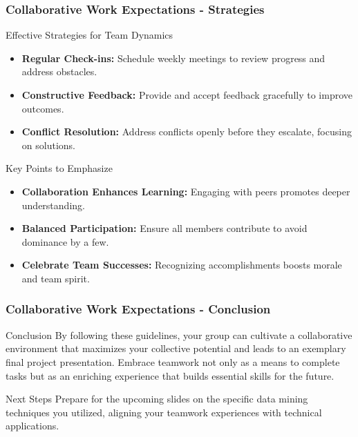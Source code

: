 \documentclass[aspectratio=169]{beamer}
\begin{document}
\begin{frame}[fragile]
    \frametitle{Collaborative Work Expectations - Strategies}
    \begin{block}{Effective Strategies for Team Dynamics}
        \begin{itemize}
            \item \textbf{Regular Check-ins:} Schedule weekly meetings to review progress and address obstacles.
            \item \textbf{Constructive Feedback:} Provide and accept feedback gracefully to improve outcomes.
            \item \textbf{Conflict Resolution:} Address conflicts openly before they escalate, focusing on solutions.
        \end{itemize}
    \end{block}

    \begin{block}{Key Points to Emphasize}
        \begin{itemize}
            \item \textbf{Collaboration Enhances Learning:} Engaging with peers promotes deeper understanding.
            \item \textbf{Balanced Participation:} Ensure all members contribute to avoid dominance by a few.
            \item \textbf{Celebrate Team Successes:} Recognizing accomplishments boosts morale and team spirit.
        \end{itemize}
    \end{block}
\end{frame}

\begin{frame}[fragile]
    \frametitle{Collaborative Work Expectations - Conclusion}
    \begin{block}{Conclusion}
        By following these guidelines, your group can cultivate a collaborative environment that maximizes your collective potential and leads to an exemplary final project presentation. Embrace teamwork not only as a means to complete tasks but as an enriching experience that builds essential skills for the future.
    \end{block}

    \begin{block}{Next Steps}
        Prepare for the upcoming slides on the specific data mining techniques you utilized, aligning your teamwork experiences with technical applications.
    \end{block}
\end{frame}
\end{document}
